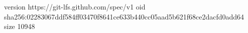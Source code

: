 version https://git-lfs.github.com/spec/v1
oid sha256:02283067ddf584ff03470f8641ce633b440cc05aad5b621f68ce2dacfd0add64
size 10948
